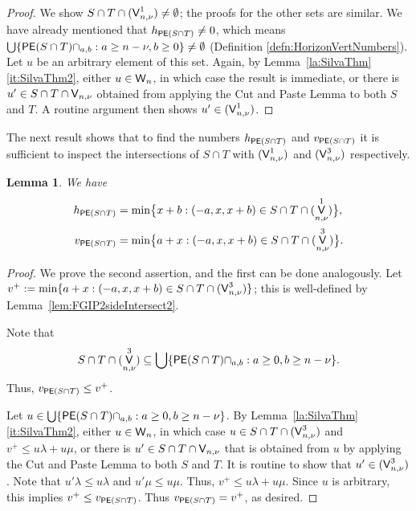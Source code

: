 \documentclass[reqno]{amsart}
\theoremstyle{plain}
\newtheorem{lem}{Lemma}[section]
\theoremstyle{definition}
\let\P\relax
\DeclareMathOperator{\P}{\textup{\textsf{P}}}
\DeclareMathOperator{\PE}{\textup{\textsf{PE}}}
\DeclareMathOperator{\W}{\textup{\textsf{W}}}
\DeclareMathOperator{\V}{\textup{\textsf{V}}}
\numberwithin{equation}{section}
\begin{document}
\begin{proof}
We show $S\cap T\cap \P(\V_{n,\nu}^1) \neq \emptyset$; 
the proofs for the other sets
are similar. 
We have already mentioned that $h_{\PE(S\cap T)}\neq 0$, which means 
$\bigcup\{\PE(S\cap T)\cap \P_{a,b} : a\geq n-\nu, b\geq 0\}\neq \emptyset$
(Definition \ref{defn:HorizonVertNumbers}).
Let $u$ be an arbitrary element of this set. Again, by Lemma~\ref{la:SilvaThm} \ref{it:SilvaThm2}, either $u\in \W_{n}$, in which case the result is immediate, or there is $u'\in S\cap T\cap \V_{n,\nu}$ obtained from applying the Cut and Paste Lemma to both $S$ and $T$. A routine argument then shows $u'\in \P(\V_{n,\nu}^1)$.
\end{proof}

The next result shows that to find the numbers $h_{\PE(S\cap T)} $ and $v_{\PE(S\cap T)}$ it is sufficient to inspect the intersections of $S\cap T$ with $\P(\V_{n, \nu}^1)$ and $ \P(\V_{n,\nu}^3)$ respectively.

\begin{lem}
\label{lem:FGIPhvPositive}
We have
\begin{align*}
    h_{\PE(S\cap T)} &= \min\bigl\{x+b : (-a, x, x+b) \in S\cap T\cap \P(\V_{n, \nu}^1)\bigr\},\\
    v_{\PE(S\cap T)} &= \min\bigl\{a+x : (-a, x, x+b)\in S\cap T\cap \P(\V_{n,\nu}^3)\bigr\}.
\end{align*}
\end{lem}


\begin{proof}
We prove the second assertion, and the first can be done analogously. Let $v^+ := \min\{a+x : (-a, x, x+b)\in S\cap T\cap \P(\V_{n,\nu}^3)\}$; this is well-defined by Lemma~\ref{lem:FGIP2sideIntersect2}. 

Note that 
\[S\cap T\cap \P(\V_{n,\nu}^3) \subseteq \bigcup\{\PE(S\cap T)\cap \P_{a,b} : a\geq 0, b\geq n-\nu\}.
\]
Thus, $v_{\PE(S\cap T)}\leq v^+$.

Let $u \in \bigcup\{\PE(S\cap T)\cap \P_{a,b} : a\geq 0, b\geq n-\nu\}
$. By Lemma~\ref{la:SilvaThm} \ref{it:SilvaThm2}, either $u\in \W_{n}$, in which case $u\in S\cap T\cap \P(\V_{n,\nu}^3)$ and $v^+\leq u\lambda + u\mu$, or there is $u'\in S\cap T\cap \V_{n,\nu}$ that is obtained from $u$ by applying the Cut and Paste Lemma to both $S$ and $T$. It is routine to show that $u'\in \P(\V_{n,\nu}^3)$. Note that $u'\lambda\leq u\lambda$ and $u'\mu\leq u\mu$. Thus, $v^+\leq u\lambda + u\mu$. Since $u$ is arbitrary, this implies $v^+\leq v_{\PE(S\cap T)}$. Thus $v_{\PE(S\cap T)}=v^+$, as desired.
\end{proof}
\end{document}
